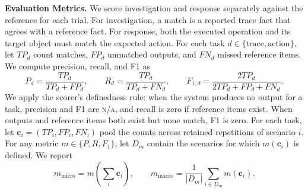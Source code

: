 \documentclass[pdflatex,sn-basic]{sn-jnl}
\newcommand{\NA}{\textsc{n/a}}
\begin{document}

\noindent\textbf{Evaluation Metrics.} We score investigation and response separately against the reference for each trial. For investigation, a match is a reported trace fact that agrees with a reference fact. For response, both the executed operation and its target object must match the expected action. For each task $d\in\{\mathrm{trace},\mathrm{action}\}$, let $TP_d$ count matches, $FP_d$ unmatched outputs, and $FN_d$ missed reference items. We compute precision, recall, and F1 as
\begin{equation}
P_d=\frac{TP_d}{TP_d+FP_d},\qquad
R_d=\frac{TP_d}{TP_d+FN_d},\qquad
F_{1,d}=\frac{2TP_d}{2TP_d+FP_d+FN_d}.
\end{equation}
We apply the scorer's definedness rule: when the system produces no output for a task, precision and F1 are \NA{}, and recall is zero if reference items exist. When outputs and reference items both exist but none match, F1 is zero. For each task, let $\mathbf{c}_i=(TP_i,FP_i,FN_i)$ pool the counts across retained repetitions of scenario $i$. For any metric $m\in\{P,R,F_1\}$, let $D_m$ contain the scenarios for which $m(\mathbf{c}_i)$ is defined. We report
\begin{equation}
m_{\mathrm{micro}}=m\!\left(\sum_i\mathbf{c}_i\right),\qquad
m_{\mathrm{macro}}=\frac{1}{|D_m|}\sum_{i\in D_m}m(\mathbf{c}_i).
\end{equation}
\end{document}
